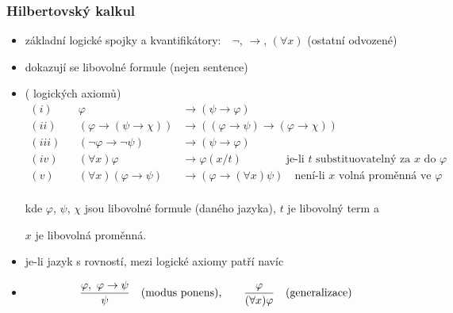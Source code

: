 \subsubsection*{Hilbertovský kalkul}
    \begin{itemize}
    \item základní logické spojky a kvantifikátory:\ \ $\neg$, $\to$, $(\forall x)$ (ostatní odvozené)
    
    \item dokazují se libovolné formule (nejen sentence)
    
    \item {} ( logických axiomů)
    \vspace{-2mm}\begin{align*}(i)& &\varphi &\to (\psi \to \varphi) \\
    (ii)& &(\varphi\to (\psi \to \chi))&\to ((\varphi \to \psi)\to(\varphi \to \chi))\qquad\qquad\qquad\qquad\phantom{\ } \\
    (iii)& &(\neg \varphi \to \neg \psi)&\to(\psi \to \varphi)\\
    (iv)& &(\forall x)\varphi &\to\varphi(x/t)\quad\quad\quad\ \ \ \text{ je-li $t$ substituovatelný za $x$ do $\varphi$}\\
    (v)& &(\forall x)(\varphi \to \psi)&\to(\varphi \to (\forall x)\psi)\quad\text{není-li $x$ volná proměnná ve $\varphi$}\\
    \end{align*}
    
    \vspace{-6mm}
    kde $\varphi$, $\psi$, $\chi$ jsou libovolné formule (daného jazyka), $t$ je libovolný term a
    \vspace{0.5mm}
    
    $x$ je libovolná proměnná.
    \smallskip
    
    \item je-li jazyk s rovností, mezi logické axiomy patří navíc 
    
    \item {}
    \vspace{-2mm}
    $$\frac{\varphi,\ \varphi \to \psi}{\psi}\quad\text{{(modus ponens)},}\qquad\frac{\varphi}{(\forall x)\varphi}\quad\text{{(generalizace)}}$$
    \end{itemize}
    
    
    
